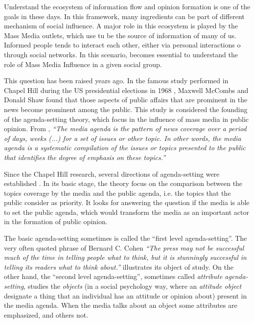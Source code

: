 \documentclass[a4paper, 12pt]{article}
\begin{document}
\par Understand the ecosystem of information flow and opinion formation is one of the goals in these days. In this framework, many ingredients can be part of different mechanism of social influence. A major role in this ecosystem is played by the Mass Media outlets, which use tu be the source of information of many of us.  Informed people tends to interact each other, either via personal interactions o through social networks. In this scenario, becomes essential to understand the role of Mass Media Influence in a given social group.
\par  This question has been raised years ago. In the famous study performed in Chapel Hill during the US presidential elections in 1968 \cite{mccombs1972agenda}, Maxwell McCombs and Donald Shaw found that those aspects of public affairs that are prominent in the news become prominent among the public.
This study is considered the founding of the agenda-setting theory, which focus in the influence of mass media in public opinion.  
From \cite{mccombs2014agenda}, \textit{``The media agenda is the pattern of news coverage over a period of days, weeks (...) for a set of issues or other topic. In other words, the media agenda is a systematic compilation of the issues or topics presented to the public that identifies the degree of emphasis on these topics.''}

\par Since the Chapel Hill research, several directions of agenda-setting were established \cite{mccombs2005look}.
In its basic stage, the theory focus on the comparison between the topics coverage by the media and the public agenda, i.e. the topics that the public consider as priority.
It looks for answering the question if the media is able to set the public agenda, which would transform the media as an important actor in the formation of public opinion. 

\par The basic agenda-setting sometimes is called the ``first level agenda-setting''.  The very often quoted phrase of Bernard C. Cohen \textit{``The press may not be successful much of the time in telling people what to think, but it is stunningly successful in telling its readers what to think about.''} illustrates its object of study. On the other hand, the ``second level agenda-setting'', sometimes called \textit{attribute agenda-setting}, studies the \textit{objects} (in a social psychology way, where an \textit{attitude object} designate a thing that an individual has an attitude or opinion about) present in the media agenda. When the media talks about an object some attributes are emphasized, and others not. 
\end{document}
